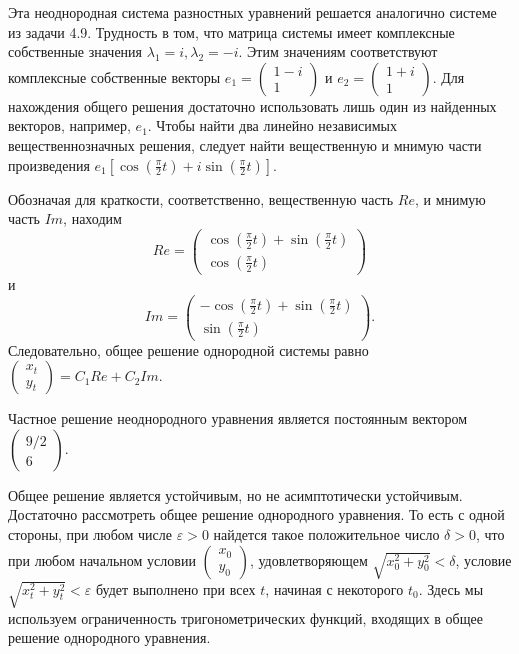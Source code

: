 \begin{solution}
Эта неоднородная система разностных уравнений решается  аналогично системе из задачи 4.9. Трудность в том, что матрица системы имеет комплексные собственные значения $\lambda _{1} =i, \lambda _{2} =-i$. Этим значениям соответствуют комплексные собственные векторы $e_{1} =\left(\begin{array}{c} {1-i} \\ {1} \end{array}\right)$ и $e_{2} =\left(\begin{array}{c} {1+i} \\ {1} \end{array}\right)$. Для нахождения общего решения достаточно использовать лишь один из найденных векторов, например, $e_{1} $. Чтобы найти два линейно независимых вещественнозначных решения, следует найти вещественную и мнимую части произведения $e_{1} \left[\cos (\frac{\pi }{2} t)+i\sin (\frac{\pi }{2} t)\right]$. 

Обозначая для краткости, соответственно, вещественную часть $Re$, и мнимую часть $Im$, находим 
\[
Re=\left(\begin{array}{c} {\cos (\frac{\pi }{2} t)+\sin (\frac{\pi }{2} t)} \\ {\cos (\frac{\pi }{2} t)} \end{array}\right)
\]
и 
\[
Im=\left(\begin{array}{c} {-\cos (\frac{\pi }{2} t)+\sin (\frac{\pi }{2} t)} \\ {\sin (\frac{\pi }{2} t)} \end{array}\right).
\] 
Следовательно, общее решение однородной системы равно $\left(\begin{array}{c} {x_{t} } \\ {y_{t} } \end{array}\right)=C_{1} Re+C_{2} Im$.


 Частное решение неоднородного уравнения является постоянным вектором $\left(\begin{array}{c} {9/2} \\ {6} \end{array}\right)$.  
 
 
Общее решение является устойчивым, но не асимптотически устойчивым.  Достаточно рассмотреть общее решение однородного уравнения. То есть с одной стороны, при любом числе $\varepsilon>0$ найдется такое положительное число $\delta>0$, что при любом начальном условии 
$
\begin{pmatrix}
x_0 \\
y_0
\end{pmatrix}
$,
удовлетворяющем $\sqrt{x_0^2+y_0^2}<\delta$, условие $\sqrt{x_t^2+y_t^2}<\varepsilon$ будет выполнено при всех $t$, начиная с некоторого $t_0$. Здесь мы используем ограниченность тригонометрических функций, входящих в общее решение однородного уравнения.



\end{solution}
